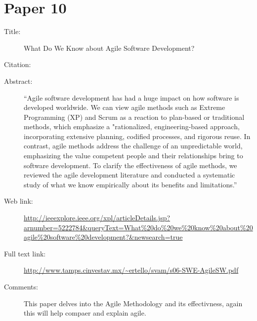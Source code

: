 \documentclass{scrartcl}
\begin{document}
\section*{Paper 10}
\begin{description}
	\item[Title:] What Do We Know about Agile Software Development? 
	\item[Citation:] \cite{AboutAgile}
	\item[Abstract:] ``Agile software development has had a huge impact on how software is developed worldwide. We can view agile methods such as Extreme Programming (XP) and Scrum as a reaction to plan-based or traditional methods, which emphasize a "rationalized, engineering-based approach, incorporating extensive planning, codified processes, and rigorous reuse. In contrast, agile methods address the challenge of an unpredictable world, emphasizing the value competent people and their relationships bring to software development. To clarify the effectiveness of agile methods, we reviewed the agile development literature and conducted a systematic study of what we know empirically about its benefits and limitations.''
	\item[Web link:] \url{http://ieeexplore.ieee.org/xpl/articleDetails.jsp?arnumber=5222784&queryText=What%20do%20we%20know%20about%20agile%20software%20development?&newsearch=true}
	\item[Full text link:] \url{http://www.tamps.cinvestav.mx/~ertello/svam/s06-SWE-AgileSW.pdf}
	\item[Comments:] This paper delves into the Agile Methodology and its effectivness, again this will help compaer and explain agile.
\end{description}
\end{document}
